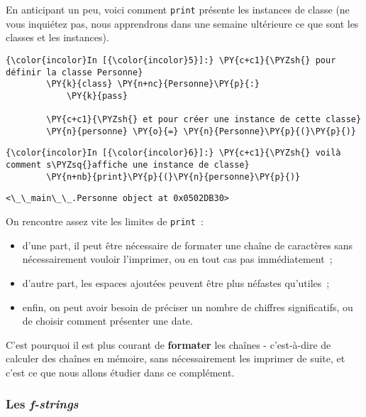     En anticipant un peu, voici comment \texttt{print} présente les
instances de classe (ne vous inquiétez pas, nous apprendrons dans une
semaine ultérieure ce que sont les classes et les instances).

    \begin{Verbatim}[commandchars=\\\{\}]
{\color{incolor}In [{\color{incolor}5}]:} \PY{c+c1}{\PYZsh{} pour définir la classe Personne}
        \PY{k}{class} \PY{n+nc}{Personne}\PY{p}{:}
            \PY{k}{pass}
        
        \PY{c+c1}{\PYZsh{} et pour créer une instance de cette classe}
        \PY{n}{personne} \PY{o}{=} \PY{n}{Personne}\PY{p}{(}\PY{p}{)}
\end{Verbatim}


    \begin{Verbatim}[commandchars=\\\{\}]
{\color{incolor}In [{\color{incolor}6}]:} \PY{c+c1}{\PYZsh{} voilà comment s\PYZsq{}affiche une instance de classe}
        \PY{n+nb}{print}\PY{p}{(}\PY{n}{personne}\PY{p}{)}
\end{Verbatim}


    \begin{Verbatim}[commandchars=\\\{\}]
<\_\_main\_\_.Personne object at 0x0502DB30>

    \end{Verbatim}

    On rencontre assez vite les limites de \texttt{print}~:

\begin{itemize}
\tightlist
\item
  d'une part, il peut être nécessaire de formater une chaîne de
  caractères sans nécessairement vouloir l'imprimer, ou en tout cas pas
  immédiatement~;
\item
  d'autre part, les espaces ajoutées peuvent être plus néfastes
  qu'utiles~;
\item
  enfin, on peut avoir besoin de préciser un nombre de chiffres
  significatifs, ou de choisir comment présenter une date.
\end{itemize}

C'est pourquoi il est plus courant de \textbf{formater} les chaînes -
c'est-à-dire de calculer des chaînes en mémoire, sans nécessairement les
imprimer de suite, et c'est ce que nous allons étudier dans ce
complément.

    \hypertarget{les-f-strings}{%
\subsubsection{\texorpdfstring{Les
\emph{f-strings}}{Les f-strings}}\label{les-f-strings}}

